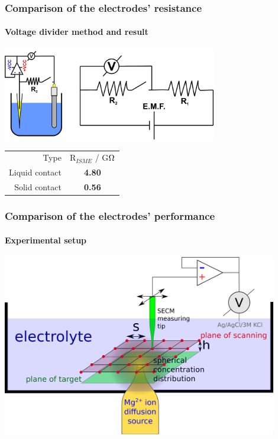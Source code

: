 \documentclass{beamer}
\begin{document}
\begin{frame}
\frametitle{Comparison of the electrodes' resistance}
\framesubtitle{Voltage divider method and result}
\begin{center}
\includegraphics[width=0.7\textwidth]{divider_switch.jpg}
\vfill
\begin{table}
                \centering
                \begin{tabular}{r c}
                        Type & R$_{ISME}$ / G$\ohm$ \\
			\cline{1-2}
			Liquid contact & \textbf{\textcolor{white!100}{\colorbox{red!100}{4.80}}} \\
                        Solid contact &  \textbf{\textcolor{black!100}{\colorbox{green!100}{0.56}}} \\

                \end{tabular}
\end{table}
\end{center}
\end{frame}

\begin{frame}
\frametitle{Comparison of the electrodes' performance}
\framesubtitle{Experimental setup}
\begin{center}
\includegraphics[width=0.9\textwidth]{setup.eps}
\end{center}
\end{frame}
\end{document}
